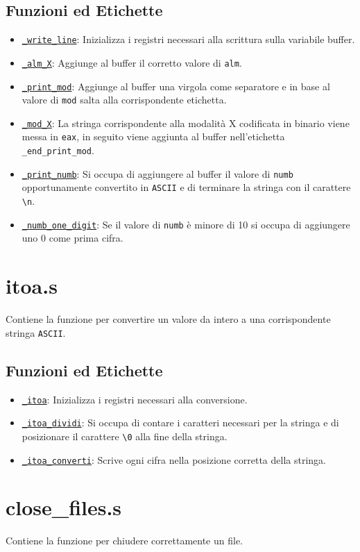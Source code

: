 \documentclass[a4paper,11pt]{article}
\newcommand{\itemtt}[1]{\item \texttt{#1}}
\begin{document}
	\subsection{Funzioni ed Etichette}
	\begin{itemize}
		\itemtt{\hyperref[e:6:1]{\_write\_line}}: Inizializza i registri necessari alla scrittura sulla variabile buffer.
		\itemtt{\hyperref[e:6:2]{\_alm\_X}}: Aggiunge al buffer il corretto valore di \texttt{alm}.
		\itemtt{\hyperref[e:6:3]{\_print\_mod}}: Aggiunge al buffer una virgola come separatore e in base al valore di \texttt{mod} salta alla corrispondente etichetta.
		\itemtt{\hyperref[e:6:4]{\_mod\_X}}: La stringa corrispondente alla modalità X codificata in binario viene messa in \texttt{eax}, in seguito viene aggiunta al buffer nell'etichetta \texttt{\_end\_print\_mod}.
		\itemtt{\hyperref[e:6:5]{\_print\_numb}}: Si occupa di aggiungere al buffer il valore di \texttt{numb} opportunamente convertito in \texttt{ASCII} e di terminare la stringa con il carattere \texttt{\textbackslash n}.
		\itemtt{\hyperref[e:6:6]{\_numb\_one\_digit}}: Se il valore di \texttt{numb} è minore di 10 si occupa di aggiungere uno 0 come prima cifra.
	\end{itemize}
	
	\section{itoa.s}
	Contiene la funzione per convertire un valore da intero a una corrispondente stringa \texttt{ASCII}.
	\subsection{Funzioni ed Etichette} 
	\begin{itemize}
		\itemtt{\hyperref[e:7:1]{\_itoa}}: Inizializza i registri necessari alla conversione.
		\itemtt{\hyperref[e:7:2]{\_itoa\_dividi}}: Si occupa di contare i caratteri necessari per la stringa e di posizionare il carattere \texttt{\textbackslash 0} alla fine della stringa.
		\itemtt{\hyperref[e:7:3]{\_itoa\_converti}}: Scrive ogni cifra nella posizione corretta della stringa.
	\end{itemize}
	
	\section{close\_files.s}
	Contiene la funzione per chiudere correttamente un file. 
	
	
	\newpage
	
\end{document}
